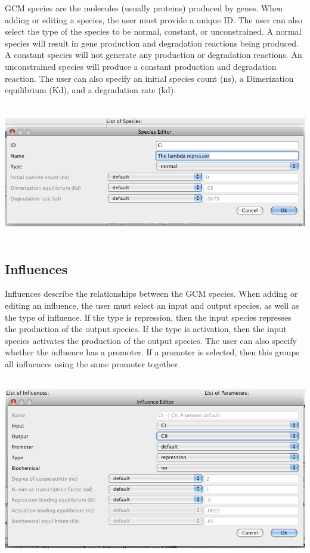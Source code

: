 \documentclass[titlepage,11pt]{article}
\begin{document}
\noindent
GCM species are the molecules (usually proteins) produced by genes. 
When adding or editing a species, the user must provide a unique ID. 
The user can also select the type of the species to be normal, constant, 
or unconstrained.
A normal species will result in gene production and degradation reactions
being produced.  A constant species will not generate any
production or degradation reactions.  An unconstrained species will
produce a constant production and degradation reaction.
The user can also specify an initial species count (ns), a 
Dimerization equilibrium (Kd), and a degradation rate (kd).
\begin{center}
\includegraphics[height=60mm]{screenshots/GCMspecies}
\end{center}

\subsection{\label{Influences}Influences}

\noindent
Influences describe the relationships between the GCM species.
When adding or editing an influence, the user must select an
input and output species, as well as the type of influence. If
the type is repression, then the input species represses the
production of the output species. If the type is activation, then
the input species activates the production of the output species.
The user can also specify whether the influence has a promoter.
If a promoter is selected, then this groups all influences using
the same promoter together. 
\begin{center}
\includegraphics[height=80mm]{screenshots/influence}
\end{center}
\end{document}
